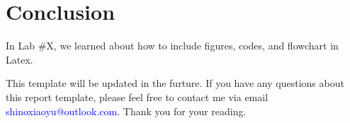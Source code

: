 \section{Conclusion}

In Lab \#X, we learned about how to include figures, codes, and flowchart in Latex.

This template will be updated in the furture. If you have any questions about this report template, please feel free to contact me via email {\textcolor{blue}{shinoxiaoyu@outlook.com}}. Thank you for your reading.